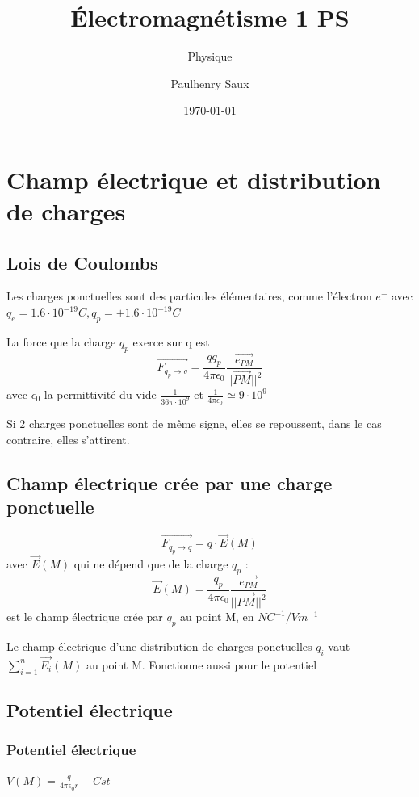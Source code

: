 \documentclass[french]{yLectureNote}
\title{Électromagnétisme 1 PS}
\subtitle{Physique}
\author{Paulhenry Saux}
\date{\today}
\renewcommand{\vec}{\overrightarrow}
\newcommand{\norm}[1]{||\vec{#1}||}
\newcommand{\E}{\vec{E}(M)}
\begin{document}
\chapter{Champ électrique et distribution de charges}
\section{Lois de Coulombs}
\begin{definition}
Les charges ponctuelles sont des particules élémentaires, comme l'électron \(e^-\) avec \(q_e = 1.6\cdot 10^{-19}C, q_p = + 1.6\cdot 10^{-19}C\)
\end{definition}
\begin{theorem}
La force que la charge \(q_p\) exerce sur q est \[\vec{F_{q_p\to q}} = \frac{qq_p}{4\pi \epsilon_0}\frac{\vec{e_{PM}}}{\norm{PM}^2}\] avec \(\epsilon_0\) la permittivité du vide \(\frac{1}{36\pi \cdot 10^{9}}\) et \(\frac{1}{4\pi \epsilon_0}\simeq 9\cdot 10^{9}\)
\end{theorem}

Si 2 charges ponctuelles sont de m\^eme signe, elles se repoussent, dans le cas contraire, elles s'attirent.
\section{Champ électrique crée par une charge ponctuelle}
\begin{definition}
\[\vec{F_{q_p\to q}} = q \cdot \E\] avec \(\E\) qui ne dépend que de la charge \(q_p\) : \[\E = \frac{q_p}{4\pi\epsilon_0}\frac{\vec{e_{PM}}}{\norm{PM}^2}\] est le champ électrique crée par \(q_p\) au point M, en \(NC^{-1} / Vm^{-1}\)
\end{definition}
\begin{theorem}
Le champ électrique d'une distribution de charges ponctuelles \(q_i\)  vaut \(\sum_{i=1}^n \vec{E_i}(M)\) au point M. Fonctionne aussi pour le potentiel
\end{theorem}
\section{Potentiel électrique}
\subsection{Potentiel électrique}
\begin{definition}
\(V(M) = \frac{q}{4\pi\epsilon_0 r} + Cst\)
\end{definition}
\end{document}
